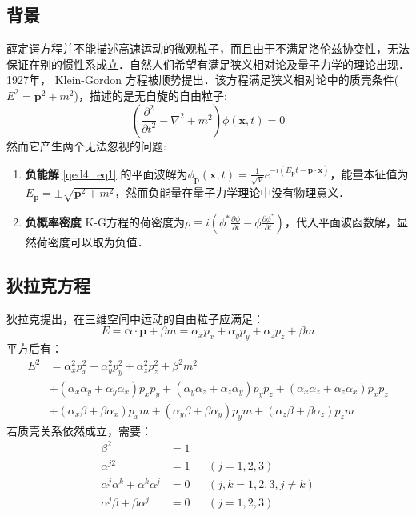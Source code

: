 
\subsection{背景}
薛定谔方程并不能描述高速运动的微观粒子，而且由于不满足洛伦兹协变性，无法保证在别的惯性系成立．自然人们希望有满足狭义相对论及量子力学的理论出现．1927年， Klein-Gordon 方程被顺势提出．该方程满足狭义相对论中的质壳条件($E^{2}=\boldsymbol{p}^{2}+m^{2}$)，描述的是无自旋的自由粒子:
\begin{equation}\label{qed4_eq1}
\left(\frac{\partial^{2}}{\partial t^{2}}-\nabla^{2}+m^{2}\right) \phi(\boldsymbol{x}, t)=0
\end{equation}
然而它产生两个无法忽视的问题:

\begin{enumerate}
\item \textbf{负能解}
\autoref{qed4_eq1} 的平面波解为$\phi_{\boldsymbol{p}}(\boldsymbol{x}, t)=\frac{1}{\sqrt{V}} e^{-i\left(E_{\boldsymbol{p}} t-\boldsymbol{p} \cdot \boldsymbol{x}\right)}$，能量本征值为
$E_{\boldsymbol{p}}=\pm \sqrt{\boldsymbol{p}^{2}+m^{2}}$，然而负能量在量子力学理论中没有物理意义．
\item \textbf{负概率密度}
K-G方程的荷密度为$\rho \equiv i\left(\phi^{*} \frac{\partial \phi}{\partial t}-\phi \frac{\partial \phi^{*}}{\partial t}\right)$，代入平面波函数解，显然荷密度可以取为负值．
\end{enumerate}
\subsection{狄拉克方程}
狄拉克提出，在三维空间中运动的自由粒子应满足：
\begin{equation}
E=\boldsymbol{\alpha} \cdot \boldsymbol{p}+\beta m=\alpha_{x} p_{x}+\alpha_{y} p_{y}+\alpha_{z} p_{z}+\beta m
\end{equation}
平方后有：\begin{equation}
\begin{aligned}
E^{2} &=\alpha_{x}^{2} p_{x}^{2}+\alpha_{y}^{2} p_{y}^{2}+\alpha_{z}^{2} p_{z}^{2}+\beta^{2} m^{2} \\
&+\left(\alpha_{x} \alpha_{y}+\alpha_{y} \alpha_{x}\right) p_{x} p_{y}+\left(\alpha_{y} \alpha_{z}+\alpha_{z} \alpha_{y}\right) p_{y} p_{z}+\left(\alpha_{x} \alpha_{z}+\alpha_{z} \alpha_{x}\right) p_{x} p_{z} \\
&+\left(\alpha_{x} \beta+\beta \alpha_{x}\right) p_{x} m+\left(\alpha_{y} \beta+\beta \alpha_{y}\right) p_{y} m+\left(\alpha_{z} \beta+\beta \alpha_{z}\right) p_{z} m
\end{aligned}
\end{equation}
若质壳关系依然成立，需要：
\begin{equation}
\begin{aligned}
\beta^{2} &=1 & & \\
\alpha^{j 2} &=1 & &(j=1,2,3) \\
\alpha^{j} \alpha^{k}+\alpha^{k} \alpha^{j} &=0 & &(j, k=1,2,3, j \neq k) \\
\alpha^{j} \beta+\beta \alpha^{j} &=0 & &(j=1,2,3)
\end{aligned}
\end{equation}

